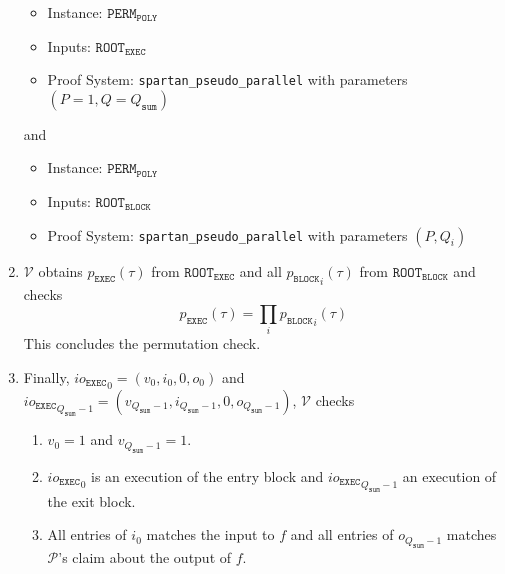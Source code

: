 \documentclass{article}
\newcommand{\code}{\texttt}
\newcommand{\Qsum}{Q_{\mathtt{sum}}}
\renewcommand{\P}{\mathcal{P}}
\newcommand{\V}{\mathcal{V}}
\newcommand{\ioe}{io_{\mathtt{EXEC}}}
\newcommand{\ROOTE}{\mathtt{ROOT_{EXEC}}}
\newcommand{\ROOTB}{\mathtt{ROOT_{BLOCK}}}
\begin{document}
\begin{enumerate}
\begin{itemize}
        \item Instance: $\mathtt{PERM}_\mathtt{POLY}$
        \item Inputs: $\ROOTE$
        \item Proof System: \code{spartan\_pseudo\_parallel} with parameters $(P = 1, Q = \Qsum)$
    \end{itemize}
    and
    \begin{itemize}
        \item Instance: $\mathtt{PERM}_\mathtt{POLY}$
        \item Inputs: $\ROOTB$
        \item Proof System: \code{spartan\_pseudo\_parallel} with parameters $(P, Q_i)$
    \end{itemize}
    \item $\V$ obtains $p_\mathtt{EXEC}(\tau)$ from $\ROOTE$ and all ${p_\mathtt{BLOCK}}_i(\tau)$ from $\ROOTB$ and checks 
    $$p_\mathtt{EXEC}(\tau) = \prod_i {p_\mathtt{BLOCK}}_i(\tau)$$
    This concludes the permutation check.
    \item Finally, ${\ioe}_0 = (v_0, i_0, 0, o_0)$ and ${\ioe}_{\Qsum - 1} = (v_{\Qsum - 1}, i_{\Qsum - 1}, 0, o_{\Qsum - 1})$, $\V$ checks
    \begin{enumerate}
        \item $v_0 = 1$ and $v_{\Qsum - 1} = 1$.
        \item ${\ioe}_0$ is an execution of the entry block and ${\ioe}_{\Qsum - 1}$ an execution of the exit block.
        \item All entries of $i_0$ matches the input to $f$ and all entries of $o_{\Qsum - 1}$ matches $\P$'s claim about the output of $f$.
    \end{enumerate}
\end{enumerate}
\end{document}
